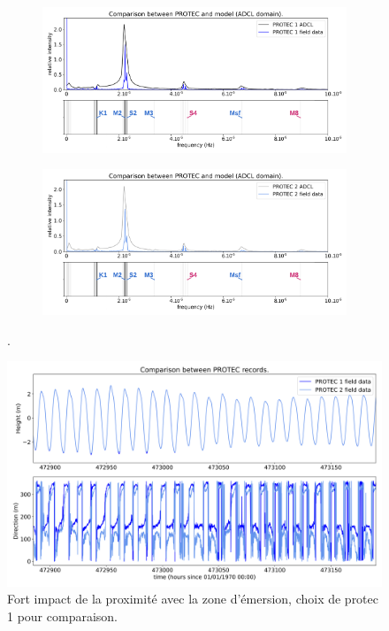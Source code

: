 \documentclass[10pt,a4paper,titlepage]{article}
\begin{document}
\begin{figure}[h!]
    \centering
    \begin{subfigure}{1.\linewidth}
        \centering
        \includegraphics[scale=0.4]{../images/post_traitement/ADCL_5_analyse_PROTEC1_field.pdf}
        \caption{}
    \end{subfigure}
    \begin{subfigure}{1.\linewidth}
        \centering
        \includegraphics[scale=0.4]{../images/post_traitement/ADCL_5_analyse_PROTEC2_field.pdf}
        \caption{}
    \end{subfigure}
    \caption{.}
    \label{fig:ana_comp_protec_ADCL}
\end{figure}

\begin{figure}[h!]
    \centering
    \includegraphics[scale=0.4]{../images/post_traitement/Speed_PROTEC1_PROTEC2.png}
    \caption{Fort impact de la proximité avec la zone d'émersion, choix de protec 1 pour comparaison.}
    \label{}
\end{figure}
\end{document}
